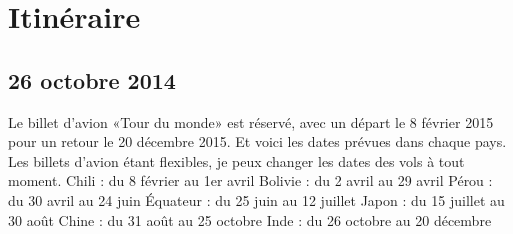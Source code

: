 \chapter{Itinéraire}
\section*{26 octobre 2014}
Le billet d'avion «Tour du monde» est réservé, avec un départ le 8 février 2015 pour un retour le 20 décembre 2015. \newline
 Et voici les dates prévues dans chaque pays. Les billets d'avion étant flexibles, je peux changer les dates des vols à tout moment. \newline
 Chili : du 8 février au 1er avril \newline
 Bolivie : du 2 avril au 29 avril \newline
 Pérou : du 30 avril au 24 juin \newline
 Équateur : du 25 juin au 12 juillet \newline
 Japon : du 15 juillet au 30 août \newline
 Chine : du 31 août au 25 octobre \newline
 Inde : du 26 octobre au 20 décembre \newline
  \newline

\newpage
 
